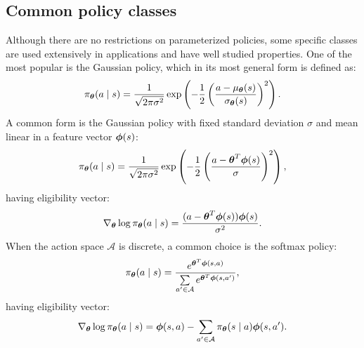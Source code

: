 \subsection{Common policy classes}
Although there are no restrictions on parameterized policies, some specific classes are used extensively in applications and have well studied properties. One of the most popular is the Gaussian policy, which in its most general form is defined as:
\[
	\pi_{\boldsymbol{\theta}}(a \mid s) = \frac{1}{\sqrt{2\pi\sigma^2}}
		\exp\left(-\frac{1}{2}\left(\frac{a-\mu_{\boldsymbol{\theta}}(s)}
		{\sigma_{\boldsymbol{\theta}}(s)}\right)^2\right).
\]
A common form is the Gaussian policy with fixed standard deviation $\sigma$ and mean linear in a feature vector $\boldsymbol{\phi}(s)$:
\[
	\pi_{\boldsymbol{\theta}}(a \mid s) = \frac{1}{\sqrt{2\pi\sigma^2}}\exp\left(
		-\frac{1}{2}\left(\frac{a-\boldsymbol{\theta}^T\boldsymbol{\phi}(s)}{\sigma}\right)^2\right),
\]
having eligibility vector:
\[
	\nabla_{\boldsymbol{\theta}}\log\pi_{\boldsymbol{\theta}}(a \mid s) = \frac{(a - \boldsymbol{\theta}^T\boldsymbol{\phi}(s))\boldsymbol{\phi}(s)}{\sigma^2}.
\]
When the action space $\mathcal{A}$ is discrete, a common choice is the softmax policy:
\[
	\pi_{\boldsymbol{\theta}}(a \mid s) = \frac{e^{\boldsymbol{\theta}^T\boldsymbol{\phi}(s,a)}}
		{\sum\limits_{a' \in \mathcal{A}}e^{\boldsymbol{\theta}^T\boldsymbol{\phi}(s,a')}},
\]
having eligibility vector:
\[
	\nabla_{\boldsymbol{\theta}}\log\pi_{\boldsymbol{\theta}}(a \mid s) = \boldsymbol{\phi}(s,a) - \sum\limits_{a' \in \mathcal{A}}\pi_{\boldsymbol{\theta}}(s \mid a)\boldsymbol{\phi}(s,a').
\]